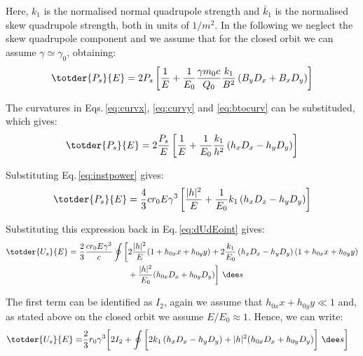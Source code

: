 Here, $k_1$ is the normalised normal quadrupole strength and $\bar{k}_1$ is the normalised skew quadrupole strength, both in units of $1/m^2$. In the following we neglect the skew quadrupole component and we assume that for the closed orbit we can assume $\gamma\simeq\gamma_0$, obtaining:
\begin{equation}
    \totder{P_s}{E} = 2 P_s \left[ \frac{1}{E} + \frac{1}{E_0} \frac{\gamma m_0 c}{Q_0} \frac{k_1}{B^2} \left( B_y D_x + B_x D_y \right) \right]
\end{equation}

The curvatures in Eqs.\,\eqref{eq:curvx}, \eqref{eq:curvy} and \eqref{eq:btocurv} can be substituded, which gives:
\begin{equation}
    \totder{P_s}{E}
    = 2 \frac{P_s}{E} \left[ \frac{1}{E} + \frac{1}{E_0} \frac{k_1}{h^2} \left( h_x D_x - h_y D_y \right) \right]
    \label{eq:dPdE}
\end{equation}

Substituting Eq.\,\eqref{eq:instpower} gives:
\begin{equation}
    \totder{P_s}{E}
    = \frac{4}{3} c r_0 E \gamma^3  \left[ \frac{|h|^2}{E} + \frac{1}{E_0} k_1 \left( h_x D_x - h_y D_y \right) \right]
\end{equation}

Substituting this expression back in Eq.\,\eqref{eq:dUdEoint} gives:
\begin{align}
    \totder{U_s}{E} = \frac{2}{3} \frac{c r_0 E \gamma^3}{c} \oint \bigg[ &2\frac{|h|^2}{E}(1 + h_{0x}x + h_{0y}y) +
    2\frac{k_1}{E_0} \left( h_x D_x - h_y D_y \right)(1 + h_{0x}x + h_{0y}y) \notag\\ &+ \frac{|h|^2}{E_0} (h_{0x}D_x + h_{0y} D_y)\bigg] \ \dee s
\end{align}

The first term can be identified as $I_2$, again we assume that $h_{0x}x + h_{0y}y \ll 1$ and, as stated above on the closed orbit we assume $E/E_0 \approx 1$. Hence, we can write:
\begin{align}
    \totder{U_s}{E} = &\frac{2}{3} r_0 \gamma^3 \bigg[2I_2
    + \oint \bigg[2k_1 \left( h_x D_x - h_y D_y \right) + |h|^2 (h_{0x}D_x + h_{0y} D_y)\bigg] \ \dee s \bigg]
\end{align}

